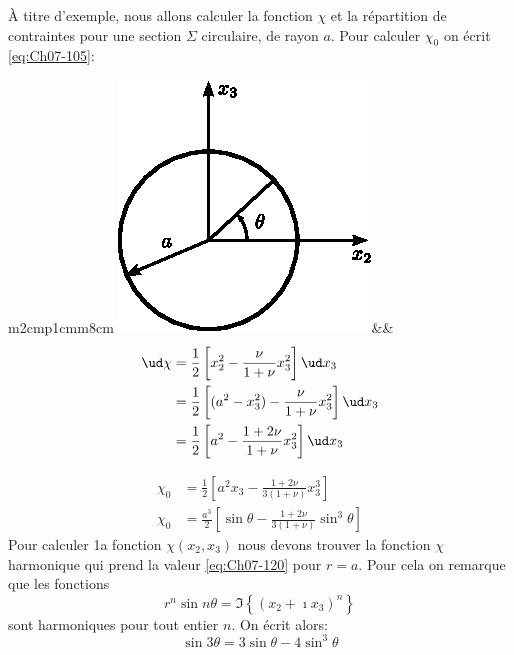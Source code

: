 À titre d'exemple, nous allons calculer la fonction $\chi$ et la répartition de contraintes pour une section $\Sigma$ circulaire, de rayon $a$.
Pour calculer $\chi_0$ on écrit \eqref{eq:Ch07-105}:\\
\begin{tabular}{m{2cm}p{1cm}m{8cm}}
    \includegraphics{../images/T1_Ch07-21}&&
    \[
    \begin{aligned}
        \ud\chi &= \frac{1}{2} \left[ x_2^2 - \frac{\nu}{1+\nu} x_3^2 \right] \ud x_3 \\
        &= \frac{1}{2} \left[ (a^2 - x_3^2) - \frac{\nu}{1+\nu} x_3^2 \right] \ud x_3 \\
        &= \frac{1}{2} \left[ a^2 - \frac{1+2\nu}{1+\nu} x_3^2 \right] \ud x_3
    \end{aligned}
    \]
\end{tabular}
\begin{equation}
    \begin{aligned}
        \chi_0 &= \frac{1}{2} \left[ a^2 x_3 - \frac{1+2\nu}{3(1+\nu)} x_3^3 \right]\\
        \chi_0 &= \frac{a^3}{2} \left[ \sin \theta - \frac{1+2\nu}{3(1+\nu)} \sin^3 \theta \right]
    \end{aligned}
    \label{eq:Ch07-120}
\end{equation}
Pour calculer 1a fonction $\chi (x_2,x_3)$ nous devons trouver la fonction $\chi$ harmonique qui prend la valeur \eqref{eq:Ch07-120} pour $r=a$.
Pour cela on remarque que les fonctions
\begin{equation}
    r^n \sin n \theta = \Im \left\{ \left( x_2 + \imath x_3 \right)^n \right\}
    \label{eq:Ch07-121}
\end{equation}
sont harmoniques pour tout entier $n$.
On écrit alors: 
\begin{equation}
    \sin 3 \theta = 3 \sin \theta - 4 \sin^3 \theta
    \label{eq:Ch07-122}
\end{equation}
